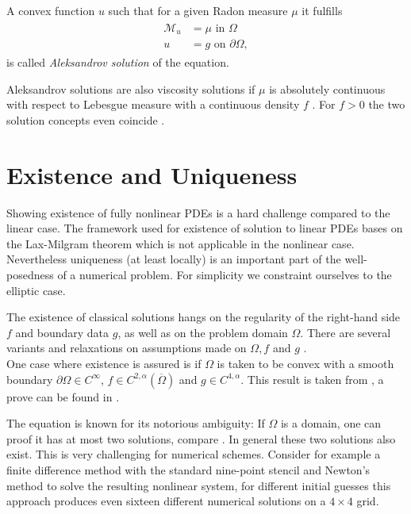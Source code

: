 \begin{definition}\label{def:aleksandrov solution}
A convex function $u$ such that for a given Radon measure $\mu$ it fulfills
\begin{align}
\begin{split}
\mathcal M_u&= \mu \text{ in } \Omega\\ 
u &= g  \text{ on } \partial \Omega,
\end{split}
\end{align}
is called \emph{Aleksandrov solution} of the \MA equation.
\end{definition}

Aleksandrov solutions are also viscosity solutions if $\mu$ is absolutely continuous with respect to Lebesgue measure with a continuous density $f$ \cite[proposition 1.3.4.]{Gutierrez2001} . For $f > 0$ the two solution concepts even coincide \cite[proposition 1.7.1]{Gutierrez2001}. 

\section{Existence and Uniqueness} \label{sec: Existence and Uniqueness}
Showing existence of fully nonlinear PDEs is a hard challenge compared to the linear case. The framework used for existence of solution to linear PDEs bases on the Lax-Milgram theorem which is not applicable in the nonlinear case. Nevertheless uniqueness (at least locally) is an important part of the well-posedness of a numerical problem. 
For simplicity we constraint ourselves to the elliptic case. 

The existence of classical solutions hangs on the regularity of the right-hand side $f$ and boundary data $g$, as well as on the problem domain $\Omega$. There are several variants and relaxations on assumptions made on $\Omega,f$ and $g$ \cite{Gutierrez2001, GT1983, Urbas1998}. \\
One case where existence is assured is if $\Omega$ is taken to be convex with a smooth boundary $\partial \Omega \in C^\infty$, $f \in C^{2,\alpha}(\overline \Omega)$ and $g \in C^{4,\alpha}$. This result is taken from \cite[p.357]{Neilan2014}, a prove can be found in \cite{Gutierrez2001}.

The \MA equation is known for its notorious ambiguity: If $\Omega$ is a domain, one can proof it has at most two solutions, compare \cite[Kap.IV, \S 5,3]{CH1968}. In general these two solutions also exist.
This is very challenging for numerical schemes. Consider for example a finite difference method with the standard nine-point stencil and Newton's method to solve the resulting nonlinear system, for different initial guesses this approach produces even sixteen different numerical solutions on a $4 \times 4$ grid\cite{FGN2013}. 

